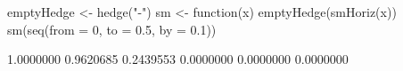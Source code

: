 \begin{Schunk}
% --begin: "emptyhedge1"
\begin{Sinput}
 emptyHedge <- hedge("-")
 sm <- function(x) emptyHedge(smHoriz(x))
 sm(seq(from = 0, to = 0.5, by = 0.1))
\end{Sinput}
\begin{Soutput}
[1] 1.0000000 0.9620685 0.2439553 0.0000000 0.0000000 0.0000000
\end{Soutput}
%
% --end: "emptyhedge1"
\end{Schunk}
